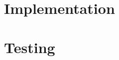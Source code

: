 \documentclass[12pt, letterpaper]{report}
\begin{document}
\clearpage
\chapter{Implementation}



\clearpage
\chapter{Testing}



%		
%		
%		
%		
%	



\end{document}
